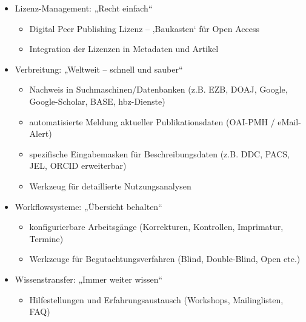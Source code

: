 \documentclass[a4paper,10pt,ngerman]{sphinxmanual}
\begin{document}
\begin{itemize}
\begin{itemize}
\item {} 
Nachrichtenfunktionen (Termine, RSS-Feeds uvm.)

\item {} 
Verknüpfung mit Zusatzprodukten wie Foren und Blogs

\end{itemize}

\item {} 
Lizenz-Management: „Recht einfach“
\begin{itemize}
\item {} 
Digital Peer Publishing Lizenz – ‚Baukasten‘ für Open Access

\item {} 
Integration der Lizenzen in Metadaten und Artikel

\end{itemize}

\item {} 
Verbreitung: „Weltweit – schnell und sauber“
\begin{itemize}
\item {} 
Nachweis in Suchmaschinen/Datenbanken  (z.B. EZB, DOAJ, Google, Google-Scholar, BASE, hbz-Dienste)

\item {} 
automatisierte Meldung aktueller Publikationsdaten (OAI-PMH / eMail-Alert)

\item {} 
spezifische Eingabemasken für Beschreibungsdaten  (z.B. DDC, PACS, JEL, ORCID erweiterbar)

\item {} 
Werkzeug für detaillierte Nutzungsanalysen

\end{itemize}

\item {} 
Workflowsysteme: „Übersicht behalten“
\begin{itemize}
\item {} 
konfigurierbare Arbeitsgänge (Korrekturen, Kontrollen, Imprimatur, Termine)

\item {} 
Werkzeuge für Begutachtungsverfahren (Blind, Double-Blind, Open etc.)

\end{itemize}

\item {} 
Wissenstransfer: „Immer weiter wissen“
\begin{itemize}
\item {} 
Hilfestellungen und Erfahrungsaustausch (Workshops, Mailinglisten, FAQ)

\end{itemize}

\end{itemize}
\end{document}
